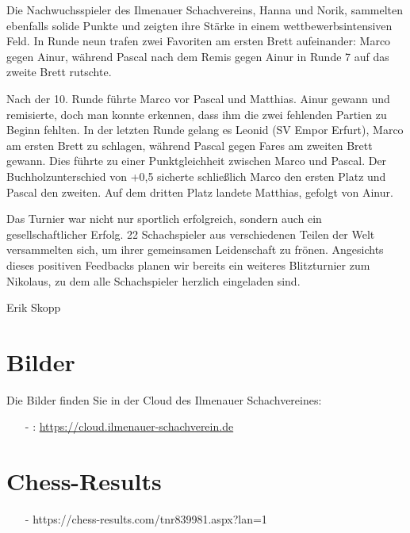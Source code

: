 \documentclass[a4paper,ngerman]{tui-algo-seminar}
\begin{document}
Die Nachwuchsspieler des Ilmenauer Schachvereins, Hanna und Norik, sammelten ebenfalls solide Punkte und zeigten ihre Stärke in einem wettbewerbsintensiven Feld. In Runde neun trafen zwei Favoriten am ersten Brett aufeinander: Marco gegen Ainur, während Pascal nach dem Remis gegen Ainur in Runde 7 auf das zweite Brett rutschte.

Nach der 10. Runde führte Marco vor Pascal und Matthias. Ainur gewann und remisierte, doch man konnte erkennen, dass ihm die zwei fehlenden Partien zu Beginn fehlten. In der letzten Runde gelang es Leonid (SV Empor Erfurt), Marco am ersten Brett zu schlagen, während Pascal gegen Fares am zweiten Brett gewann. Dies führte zu einer Punktgleichheit zwischen Marco und Pascal. Der Buchholzunterschied von +0,5 sicherte schließlich Marco den ersten Platz und Pascal den zweiten. Auf dem dritten Platz landete Matthias, gefolgt von Ainur.

Das Turnier war nicht nur sportlich erfolgreich, sondern auch ein gesellschaftlicher Erfolg. 22 Schachspieler aus verschiedenen Teilen der Welt versammelten sich, um ihrer gemeinsamen Leidenschaft zu frönen. Angesichts dieses positiven Feedbacks planen wir bereits ein weiteres Blitzturnier zum Nikolaus, zu dem alle Schachspieler herzlich eingeladen sind.

Erik Skopp

\section{Bilder}
Die Bilder finden Sie in der Cloud des Ilmenauer Schachvereines: 
\begin{itemize}
	\item[-]: \url{https://cloud.ilmenauer-schachverein.de}
\end{itemize}

\section{Chess-Results}
\begin{itemize}
	\item[-] https://chess-results.com/tnr839981.aspx?lan=1
\end{itemize}
\end{document}
